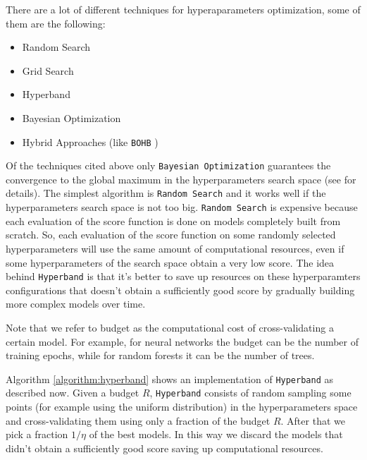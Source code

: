 \documentclass[11pt, a4paper]{article}
\begin{document}
  There are a lot of different techniques for hyperaparameters optimization, some of them are the following:
  \begin{itemize}
    \item Random Search
    \item Grid Search
    \item Hyperband
    \item Bayesian Optimization
    \item Hybrid Approaches (like \texttt{BOHB} \cite{bohb})
  \end{itemize}

  Of the techniques cited above only \texttt{Bayesian Optimization} guarantees the convergence to the global maximum in the hyperparameters search space (see \cite{bayesianoptimization} for details).
  The simplest algorithm is \texttt{Random Search} and it works well if the hyperparameters search space is not too big.
  \texttt{Random Search} is expensive because each evaluation of the score function is done on models completely built from scratch.
  So, each evaluation of the score function on some randomly selected hyperparameters will use the same amount of computational resources, even if some hyperparameters of the search space obtain a very low score.
  The idea behind \texttt{Hyperband} is that it's better to save up resources on these hyperparamters configurations that doesn't obtain a sufficiently good score by gradually building more complex models over time.
  
  Note that we refer to budget as the computational cost of cross-validating a certain model.
  For example, for neural networks the budget can be the number of training epochs, while for random forests it can be the number of trees.

  Algorithm \ref{algorithm:hyperband} shows an implementation of \texttt{Hyperband} as described now.
  Given a budget $R$, \texttt{Hyperband} consists of random sampling some points (for example using the uniform distribution) in the hyperparameters space and cross-validating them using only a fraction of the budget $R$.
  After that we pick a fraction $1/\eta$ of the best models.
  In this way we discard the models that didn't obtain a sufficiently good score saving up computational resources.
  
\end{document}
